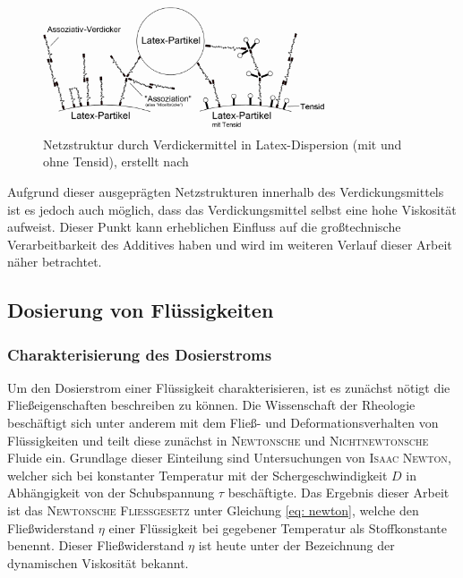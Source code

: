 \begin{figure}[h!]
	\centering
	\includegraphics[width=0.75\textwidth]{img/verdicker_anwendung}
	\caption{Netzstruktur durch Verdickermittel in Latex-Dispersion (mit und ohne Tensid), \linebreak erstellt nach \cite{Mezger.2016}}
	\label{fig: verdicker_anwendung}
\end{figure}
\FloatBarrier

Aufgrund dieser ausgeprägten Netzstrukturen innerhalb des Verdickungsmittels ist es jedoch auch möglich, dass das Verdickungsmittel selbst eine hohe Viskosität aufweist. Dieser Punkt kann erheblichen Einfluss auf die großtechnische Verarbeitbarkeit des Additives haben und wird im weiteren Verlauf dieser Arbeit näher betrachtet. 

\subsection{Dosierung von Flüssigkeiten}

\subsubsection{Charakterisierung des Dosierstroms}
Um den Dosierstrom einer Flüssigkeit charakterisieren,  ist es zunächst nötigt die Fließeigenschaften beschreiben zu können. Die Wissenschaft der Rheologie beschäftigt sich unter anderem mit dem Fließ- und Deformationsverhalten von Flüssigkeiten und teilt diese zunächst in \textsc{Newtonsche} und \textsc{Nichtnewtonsche} Fluide ein. Grundlage dieser Einteilung sind Untersuchungen von \textsc{Isaac Newton}, welcher sich bei konstanter Temperatur mit der Schergeschwindigkeit $D$ in Abhängigkeit von der Schubspannung $\tau$ beschäftigte. 
Das Ergebnis dieser Arbeit ist das \textsc{Newtonsche Fließgesetz} unter Gleichung \eqref{eq: newton}, welche den Fließwiderstand $\eta$ einer Flüssigkeit bei gegebener Temperatur als Stoffkonstante benennt. Dieser Fließwiderstand $\eta$ ist heute unter der Bezeichnung der dynamischen Viskosität bekannt.

